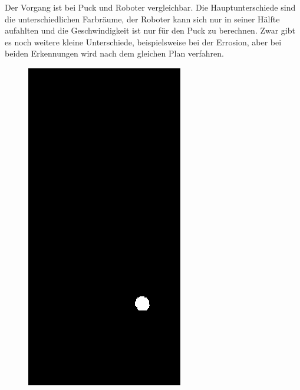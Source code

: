 Der Vorgang ist bei Puck und Roboter vergleichbar. Die Hauptunterschiede sind die unterschiedlichen Farbräume, der Roboter kann sich nur in seiner Hälfte aufahlten und die Geschwindigkeit ist nur für den Puck zu berechnen. Zwar gibt es noch weitere kleine Unterschiede, beispielsweise bei der Errosion, aber bei beiden Erkennungen wird nach dem gleichen Plan verfahren.

\begin{figure} [h]
\begin{minipage}[t]{0.25\textwidth}
\vspace{0pt}
\includegraphics[scale =0.45]{images/bin_puck}
\end{minipage}
\hspace{0.05\textwidth}
\begin{minipage}[t]{0.25\textwidth}
\vspace{0pt}

\end{minipage}
\end{figure}
